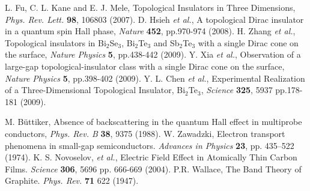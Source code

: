 \documentclass[titlepage,a4paper]{book}
\begin{document}
\begin{thebibliography}{99}
L. Fu, C. L. Kane and E. J. Mele, Topological Insulators in Three Dimensions, \textit{Phys. Rev. Lett.} \textbf{98}, 106803 (2007).
D. Hsieh \textit{et al.}, A topological Dirac insulator in a quantum spin Hall phase, \textit{Nature} \textbf{452}, pp.970-974 (2008).
H. Zhang \textit{et al.}, Topological insulators in Bi$_2$Se$_3$, Bi$_2$Te$_3$ and Sb$_2$Te$_3$ with a single Dirac cone on the surface, \textit{Nature Physics} \textbf{5}, pp.438-442 (2009).
Y. Xia \textit{et al.}, Observation of a large-gap topological-insulator class with a single Dirac cone on the surface, \textit{Nature Physics} \textbf{5}, pp.398-402 (2009).
Y. L. Chen \textit{et al.}, Experimental Realization of a Three-Dimensional Topological Insulator, Bi$_2$Te$_3$,  \textit{Science} \textbf{325}, 5937 pp.178-181 (2009).

M. Büttiker, Absence of backscattering in the quantum Hall effect in multiprobe conductors, \textit{Phys. Rev. B} \textbf{38}, 9375 (1988).
W. Zawadzki, Electron transport phenomena in small-gap semiconductors. \textit{Advances in Physics} \textbf{23}, pp. 435–522 (1974).
K. S. Novoselov, \textit{et al.}, Electric Field Effect in Atomically Thin Carbon Films. \textit{Science} \textbf{306}, 5696 pp. 666-669 (2004).
P.R. Wallace, The Band Theory of Graphite. \textit{Phys. Rev.} \textbf{71} 622 (1947).



\end{thebibliography}
\end{document}
